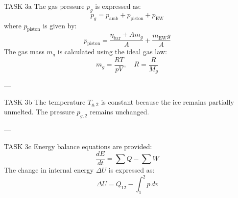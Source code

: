 TASK 3a  
The gas pressure \( p_g \) is expressed as:  
\[
p_g = p_{\text{amb}} + p_{\text{piston}} + p_{\text{EW}}
\]  
where \( p_{\text{piston}} \) is given by:  
\[
p_{\text{piston}} = \frac{\eta_{\text{bar}} + A m_g}{A} + \frac{m_{\text{EW}} g}{A}
\]  
The gas mass \( m_g \) is calculated using the ideal gas law:  
\[
m_g = \frac{RT}{pV}, \quad R = \frac{R}{M_g}
\]  

---

TASK 3b  
The temperature \( T_{g,2} \) is constant because the ice remains partially unmelted.  
The pressure \( p_{g,2} \) remains unchanged.  

---

TASK 3c  
Energy balance equations are provided:  
\[
\frac{dE}{dt} = \sum Q - \sum W
\]  
The change in internal energy \( \Delta U \) is expressed as:  
\[
\Delta U = Q_{12} - \int_{1}^{2} p \, dv
\]  